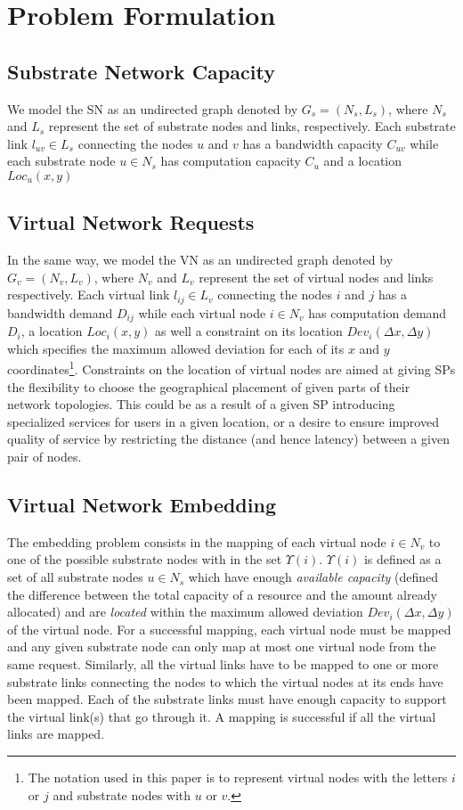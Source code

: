 \documentclass[journal]{IEEEtran}
\begin{document}
\section{Problem Formulation}
\subsection{Substrate Network Capacity}
We model the \ac{SN} as an undirected graph denoted by $G_s = (N_s, L_s)$, where $N_s$ and $L_s$ represent the set of substrate nodes and links, respectively. Each substrate link $l_{uv}\in L_s$ connecting the nodes $u$ and $v$ has a bandwidth capacity $C_{uv}$ while each substrate node $u\in N_s$ has computation capacity $C_u$ and a location $Loc_u(x,y)$
\subsection{Virtual Network Requests}
In the same way, we model the \ac{VN} as an undirected graph denoted by $G_v = (N_v, L_v)$, where $N_v$ and $L_v$ represent the set of virtual nodes and links respectively. Each virtual link $l_{ij}\in L_v$ connecting the nodes $i$ and $j$ has a bandwidth demand $D_{ij}$ while each virtual node $i\in N_v$ has computation demand $D_i$, a location $Loc_i(x,y)$ as well a constraint on its location $Dev_i(\Delta x, \Delta y)$ which specifies the maximum allowed deviation for each of its $x$ and $y$ coordinates\footnote{The notation used in this paper is to represent virtual nodes with the letters $i$ or $j$ and substrate nodes with $u$ or $v$.}. Constraints on the location of virtual nodes are aimed at giving \acp{SP} the flexibility to choose the geographical placement of given parts of their network topologies. This could be as a result of a given \ac{SP} introducing specialized services for users in a given location, or a desire to ensure improved quality of service by restricting the distance (and hence latency) between a given pair of nodes.

\subsection{Virtual Network Embedding}
The embedding problem consists in the mapping of each virtual node $i \in N_v$ to one of the possible substrate nodes with in the set $\Upsilon(i)$. $\Upsilon(i)$ is defined as a set of all substrate nodes $u \in N_s$ which have enough \emph{available capacity} (defined the difference between the total capacity of a resource and the amount already allocated) and are \emph{located} within the maximum allowed deviation $Dev_{i}(\Delta x, \Delta y)$ of the virtual node. For a successful mapping, each virtual node must be mapped and any given substrate node can only map at most one virtual node from the same request.
Similarly, all the virtual links have to be mapped to one or more substrate links connecting the nodes to which the virtual nodes at its ends have been mapped. Each of the substrate links must have enough capacity to support the virtual link(s) that go through it. A mapping is successful if all the virtual links are mapped.
\end{document}
